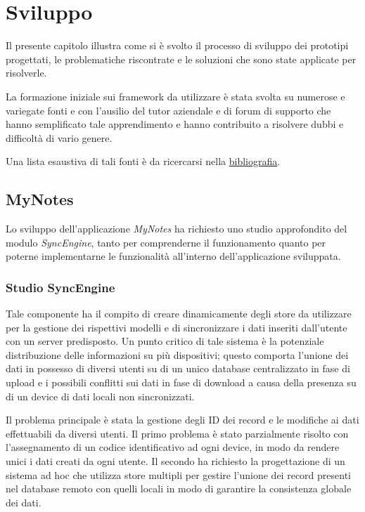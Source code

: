 \chapter{Sviluppo}\label{ch:sviluppo}
Il presente capitolo illustra come si è svolto il processo di sviluppo dei prototipi progettati, le problematiche riscontrate e le soluzioni che sono state applicate per risolverle.

La formazione iniziale sui framework da utilizzare è stata svolta su numerose e variegate fonti e con l'ausilio del tutor aziendale e di forum di supporto che hanno semplificato tale apprendimento e hanno contribuito a risolvere dubbi e difficoltà di vario genere.

Una lista esaustiva di tali fonti è da ricercarsi nella \hyperref[app:bibliography]{bibliografia}.

\section{MyNotes}
Lo sviluppo dell'applicazione \emph{MyNotes} ha richiesto uno studio approfondito del modulo \emph{SyncEngine}, tanto per comprenderne il funzionamento quanto per poterne implementarne le funzionalità all'interno dell'applicazione sviluppata.

\subsection{Studio SyncEngine}
Tale componente ha il compito di creare dinamicamente degli store da utilizzare per la gestione dei rispettivi modelli e di sincronizzare i dati inseriti dall'utente con un server predisposto.
Un punto critico di tale sistema è la potenziale distribuzione delle informazioni su più dispositivi; questo comporta l'unione dei dati in possesso di diversi utenti su di un unico database centralizzato in fase di upload e i possibili conflitti sui dati in fase di download a causa della presenza su di un device di dati locali non sincronizzati.

Il problema principale è stata la gestione degli ID dei record e le modifiche ai dati effettuabili da diversi utenti.
Il primo problema è stato parzialmente risolto con l'assegnamento di un codice identificativo ad ogni device, in modo da rendere unici i dati creati da ogni utente.
Il secondo ha richiesto la progettazione di un sistema ad hoc che utilizza store multipli per gestire l'unione dei record presenti nel database remoto con quelli locali in modo di garantire la consistenza globale dei dati.

